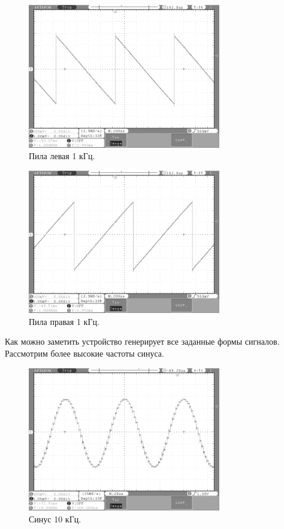 	\begin{figure}[H]
    \centering
    \includegraphics[width=0.75\textwidth]{../image/l_saw1.bmp}
    \caption{Пила левая 1 кГц.}
	\end{figure}	
	
	\begin{figure}[H]
    \centering
    \includegraphics[width=0.75\textwidth]{../image/r_saw1.bmp}
    \caption{Пила правая 1 кГц.}
	\end{figure}	
	
	Как можно заметить устройство генерирует все заданные формы сигналов. Рассмотрим более высокие частоты синуса.
	
	\begin{figure}[H]
    \centering
    \includegraphics[width=0.75\textwidth]{../image/sin10.bmp}
    \caption{Синус 10 кГц.}
	\end{figure}	
	
